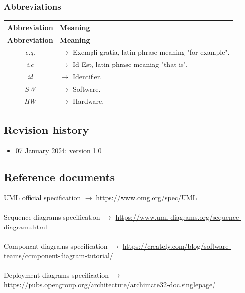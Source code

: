 \documentclass{article}
\begin{document}
{\begin{xltabular}{\textwidth}{ >{\raggedright\arraybackslash}c >{\raggedright\arraybackslash}X }
\end{xltabular}


\subsubsection{Abbreviations}
\begin{xltabular}{\textwidth}{ >{\raggedright\arraybackslash}c >{\raggedright\arraybackslash}X }
    \hline
    \textbf{Abbreviation} & \textbf{Meaning} \\
    \hline

    \endfirsthead

    \hline
    \textbf{Abbreviation} & \textbf{Meaning} \\
    \hline

    \endhead
    \endfoot
    \endlastfoot

    \textit{e.g.} & $\rightarrow$ Exempli gratia, latin phrase meaning "for example".
    \\
    \textit{i.e} & $\rightarrow$ Id Est, latin phrase meaning "that is".
    \\
    \textit{id} & $\rightarrow$ Identifier.
    \\
    \textit{SW} & $\rightarrow$ Software.
    \\
    \textit{HW} & $\rightarrow$ Hardware.
    \\
\end{xltabular}
\subsection{Revision history}
\begin{itemize}
    \item 07 January 2024: version 1.0
\end{itemize}

\subsection{Reference documents}
UML official specification $\rightarrow$ \url{https://www.omg.org/spec/UML}
\\ \\
Sequence diagrams specification $\rightarrow$ \url{https://www.uml-diagrams.org/sequence-diagrams.html}
\\ \\
Component diagrams specification $\rightarrow$ \url{https://creately.com/blog/software-teams/component-diagram-tutorial/}
\\ \\
Deployment diagrams specification $\rightarrow$ \url{https://pubs.opengroup.org/architecture/archimate32-doc.singlepage/}
}
\end{document}
